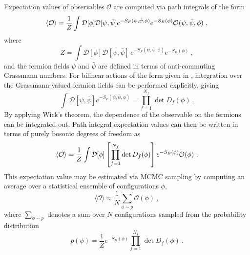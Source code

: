 \documentclass[aps,prd,twocolumn,nofootinbib,superscriptaddress,preprintnumbers]{revtex4-1}
\begin{document}
Expectation values of observables $\mathcal{O}$ are computed via path integrals of the form
%
\begin{equation}\label{eq:fermions_integral}
    \braket{\mathcal{O}}  = \frac{1}{Z} \int \mathcal{D}[\phi] \mathcal{D}[\psi, \bar{\psi}] e^{-S_F(\psi,\bar{\psi}, \phi)} e^{-S_B(\phi)} \mathcal{O}(\psi, \bar{\psi}, \phi)\ ,
\end{equation}
%
where
%
\begin{equation}\label{eq:normalizer-Z}
    Z = \int \mathcal{D}[\phi] \mathcal{D}[\psi, \bar{\psi}]  \, e^{-S_F(\psi,\bar{\psi},\phi)}e^{-S_B(\phi)}\ ,
\end{equation}
%
and the fermion fields $\psi$ and $\bar{\psi}$ are defined in terms of anti-commuting Grassmann numbers. For bilinear actions of the form given in , integration over the Grassmann-valued fermion fields can be performed explicitly, giving
%
\begin{equation}
    \int \mathcal{D}[\psi, \bar{\psi}] e^{-S_F(\psi,\bar{\psi}, \phi)} = \prod_{f=1}^{N_f} \det{D_f(\phi)}\ .
\end{equation}
%
By applying Wick's theorem, the dependence of the observable on the fermions can be integrated out. Path integral expectation values can then be written in terms of purely bosonic degrees of freedom as
%
\begin{equation}\label{eq:bosonic-obs-eval}
    \braket{\mathcal{O}} = \frac{1}{Z} \int \mathcal{D}[\phi] \left[\prod_{f=1}^{N_f} \det{D_f(\phi)}\right] e^{-S_B(\phi)} \mathcal{O}(\phi)\ .
\end{equation}
%
This expectation value may be estimated via MCMC sampling by computing an average over a statistical ensemble of configurations $\phi$,
%
\begin{equation}
    \langle\mathcal{O}\rangle \approx \frac{1}{N} \sum_{\phi \sim p} \mathcal{O}(\phi)\ ,
\end{equation}
%
where $\sum_{\phi \sim p}$ denotes a sum over $N$ configurations sampled from the probability distribution
%
\begin{equation}\label{eq:marginal-dist}
    p(\phi) = \frac{1}{Z} e^{-S_B(\phi)} \prod_{f=1}^{N_f} \det D_f(\phi)\ .
\end{equation}
\end{document}
